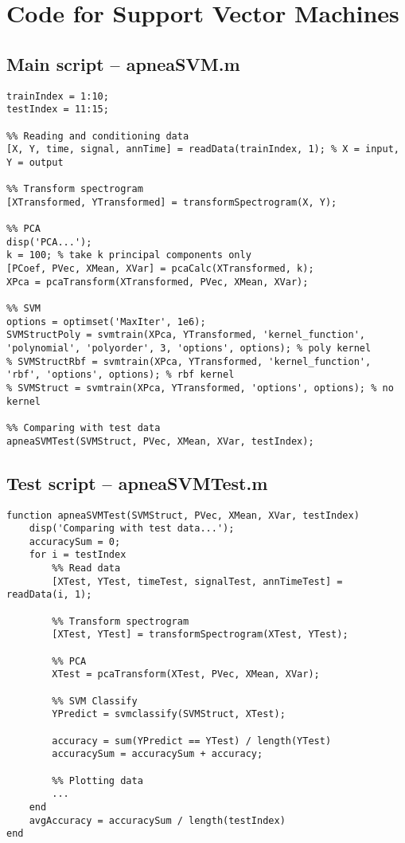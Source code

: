 \chapter{Code for Support Vector Machines}
\section{Main script -- apneaSVM.m}
\label{sec:apneaSVM}
\begin{lstlisting}
trainIndex = 1:10;
testIndex = 11:15;

%% Reading and conditioning data
[X, Y, time, signal, annTime] = readData(trainIndex, 1); % X = input, Y = output

%% Transform spectrogram
[XTransformed, YTransformed] = transformSpectrogram(X, Y);

%% PCA
disp('PCA...');
k = 100; % take k principal components only
[PCoef, PVec, XMean, XVar] = pcaCalc(XTransformed, k);
XPca = pcaTransform(XTransformed, PVec, XMean, XVar);

%% SVM
options = optimset('MaxIter', 1e6);
SVMStructPoly = svmtrain(XPca, YTransformed, 'kernel_function', 'polynomial', 'polyorder', 3, 'options', options); % poly kernel
% SVMStructRbf = svmtrain(XPca, YTransformed, 'kernel_function', 'rbf', 'options', options); % rbf kernel
% SVMStruct = svmtrain(XPca, YTransformed, 'options', options); % no kernel

%% Comparing with test data
apneaSVMTest(SVMStruct, PVec, XMean, XVar, testIndex);
\end{lstlisting}

\section{Test script -- apneaSVMTest.m}
\label{sec:apneaSVMTest}
\begin{lstlisting}
function apneaSVMTest(SVMStruct, PVec, XMean, XVar, testIndex)
    disp('Comparing with test data...');
    accuracySum = 0;
    for i = testIndex
        %% Read data
        [XTest, YTest, timeTest, signalTest, annTimeTest] = readData(i, 1);
        
        %% Transform spectrogram
        [XTest, YTest] = transformSpectrogram(XTest, YTest);
        
        %% PCA
        XTest = pcaTransform(XTest, PVec, XMean, XVar);

        %% SVM Classify
        YPredict = svmclassify(SVMStruct, XTest);
        
        accuracy = sum(YPredict == YTest) / length(YTest)
        accuracySum = accuracySum + accuracy;
        
        %% Plotting data
        ...
    end
    avgAccuracy = accuracySum / length(testIndex)
end
\end{lstlisting}